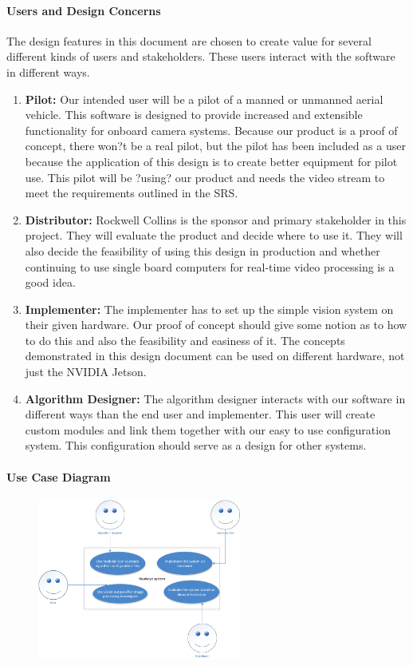 	\paragraph{Users and Design Concerns}
	The design features in this document are chosen to create value for several different
kinds of users and stakeholders. These users interact with the software in different ways.\\
	\begin{enumerate}[leftmargin=2cm,labelindent=2cm]
    	\item \textbf{Pilot:}
	Our intended user will be a pilot of a manned or unmanned aerial vehicle. This software
	is designed to provide increased and extensible functionality for onboard camera
	systems. Because our product is a proof of concept, there won?t be a real pilot, but the
	pilot has been included as a user because the application of this design is to create
	better equipment for pilot use. This pilot will be ?using? our product and needs the
	video stream to meet the requirements outlined in the SRS.
	\item \textbf{Distributor:}
	Rockwell Collins is the sponsor and primary stakeholder in this project. They will
	evaluate the product and decide where to use it. They will also decide the feasibility of
	using this design in production and whether continuing to use single board computers
	for real-time video processing is a good idea.
	\item \textbf{Implementer:}
	The implementer has to set up the simple vision system on their given hardware. Our
	proof of concept should give some notion as to how to do this and also the feasibility
	and easiness of it. The concepts demonstrated in this design document can be used on
	different hardware, not just the NVIDIA Jetson.
	\item \textbf{Algorithm Designer:}
	The algorithm designer interacts with our software in different ways than the end user
	and implementer. This user will create custom modules and link them together with our
	easy to use configuration system. This configuration should serve as a design for other
	systems.\\
	\end{enumerate}
	
	\paragraph{Use Case Diagram}
		\begin{figure}[!ht] 
		\centering
		\includegraphics[width=0.6\textwidth,natwidth=610,natheight=642]{images/UseCase_Diagram.png}  
		\end{figure}
	
